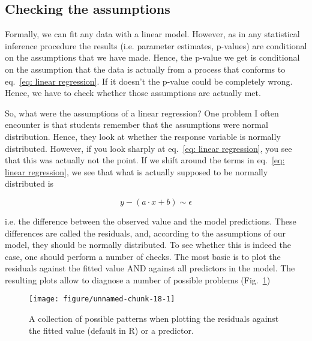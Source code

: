 \documentclass[a4paper,twoside]{tufte-book}\usepackage[]{graphicx}\usepackage[]{color}
\makeatletter
\def\maxwidth{ %
	\ifdim\Gin@nat@width>\linewidth
	\linewidth
	\else
	\Gin@nat@width
	\fi
}
\makeatother
\begin{document}
\subsection{Checking the assumptions}

Formally, we can fit any data with a linear model. However, as in any statistical inference procedure the results (i.e. parameter estimates, p-values) are conditional on the assumptions that we have made. Hence, the p-value we get is conditional on the assumption that the data is actually from a process that conforms to eq.~\ref{eq: linear regression}. If it doesn't the p-value could be completely wrong. Hence, we have to check whether those assumptions are actually met. 

So, what were the assumptions of a linear regression? One problem I often encounter is that students remember that the assumptions were normal distribution. Hence, they look at whether the response variable is normally distributed. However, if you look sharply at eq.~\ref{eq: linear regression}, you see that this was actually not the point. If we shift around the terms in eq.~\ref{eq: linear regression}, we see that what is actually supposed to be normally distributed is 

\begin{equation} \label{eq: linear regression}
y - (a \cdot x + b ) \sim \epsilon 
\end{equation}

i.e. the difference between the observed value and the model predictions. These differences are called the residuals, and, according to the assumptions of our model, they should be normally distributed. To see whether this is indeed the case, one should perform a number of checks. The most basic is to plot the residuals against the fitted value AND against all predictors in the model. The resulting plots allow to diagnose a number of possible problems (Fig.~\ref{fig: ResidualPatterns})

\begin{figure}[htbp]
\begin{center}
\begin{Schunk}

\texttt{[image: figure/unnamed-chunk-18-1]} \end{Schunk}
\caption{A collection of possible patterns when plotting the residuals against the fitted value (default in R) or a predictor.}
\label{fig: ResidualPatterns}
\end{center}
\end{figure}
\end{document}

